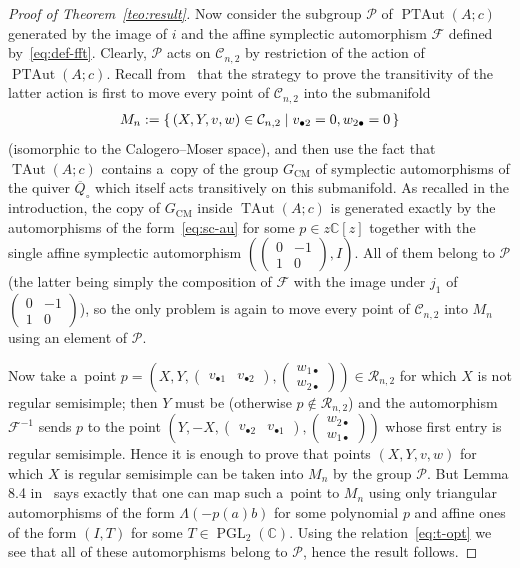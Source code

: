\documentclass[11pt]{article}
\newcommand{\bb}[1]{\mathbb{#1}}
\newcommand{\ol}[1]{\overline{#1}}
\newcommand{\smm}[1]{\left(\begin{smallmatrix} #1\end{smallmatrix}\right)}
\DeclareMathOperator{\PGL}{PGL}
\DeclareMathOperator{\TAut}{TAut}
\DeclareMathOperator{\PTAut}{PTAut}
\begin{document}
\begin{proof}[Proof of Theorem~\ref{teo:result}]
Now consider the subgroup \(\mathcal{P}\) of \(\PTAut(A;c)\) generated by the image of \(i\) and the
af\/f\/ine symplectic automorphism \(\mathcal{F}\) def\/ined by~\eqref{eq:def-fft}.
Clearly, \(\mathcal{P}\) acts on \(\mathcal{C}_{n,2}\) by restriction of the action of \(\PTAut(A;c)\).
Recall from~\cite{bp08} that the strategy to prove the transitivity of the latter action is f\/irst to move
every point of \(\mathcal{C}_{n,2}\) into the submanifold
\begin{gather*}
M_{n}\mathrel{:=}\set{(X,Y,v,w)\in\mathcal{C}_{n,2}|v_{\bullet2}=0,w_{2\bullet}=0}
\end{gather*}
(isomorphic to the Calogero--Moser space), and then use the fact that \(\TAut(A;c)\) contains a~copy of the
group \(G_{\mathrm{CM}}\) of symplectic automorphisms of the quiver \(\ol{Q}_{\circ}\) which itself acts
transitively on this submanifold.
As recalled in the introduction, the copy of \(G_{\mathrm{CM}}\) inside \(\TAut(A;c)\) is generated exactly
by the automorphisms of the form~\eqref{eq:sc-au} for some \(p\in z\bb{C}[z]\) together with the single
af\/f\/ine symplectic automorphism \((\smm{0 & -1
\\
1 & 0},I)\).
All of them belong to \(\mathcal{P}\) (the latter being simply the composition of \(\mathcal{F}\) with the
image under \(j_{1}\) of \(\smm{0 & -1
\\
1 & 0}\)), so the only problem is again to move every point of \(\mathcal{C}_{n,2}\) into \(M_{n}\) using
an element of \(\mathcal{P}\).

Now take a~point \(p = (X,Y,\smm{v_{\bullet 1} & v_{\bullet 2}}, \smm{w_{1\bullet}
\\
w_{2\bullet}})\in \mathcal{R}_{n,2}\) for which \(X\) is not regular semisimple; then \(Y\) must be
(otherwise \(p\notin \mathcal{R}_{n,2}\)) and the automorphism \(\mathcal{F}^{-1}\) sends \(p\) to the
point \((Y,-X,\smm{v_{\bullet 2} & v_{\bullet 1}}, \smm{w_{2\bullet}
\\
w_{1\bullet}})\) whose f\/irst entry is regular semisimple.
Hence it is enough to prove that points \((X,Y,v,w)\) for which \(X\) is regular semisimple can be taken
into \(M_{n}\) by the group \(\mathcal{P}\).
But Lemma 8.4 in~\cite{bp08} says exactly that one can map such a~point to \(M_{n}\) using only triangular
automorphisms of the form \(\Lambda(-p(a)b)\) for some polynomial \(p\) and af\/f\/ine ones of the form
\((I,T)\) for some \(T\in \PGL_{2}(\bb{C})\).
Using the relation~\eqref{eq:t-opt} we see that all of these automorphisms belong to \(\mathcal{P}\), hence
the result follows.
\end{proof}
\end{document}
